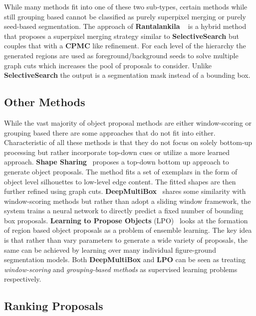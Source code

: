 While many methods fit into one of these two sub-types, certain methods while still grouping based cannot be classified as purely superpixel merging or purely seed-based segmentation. The approach of {\bf Rantalankila} \etal ~\cite{Rantalankila:etal:CVPR14} is a hybrid method that proposes a superpixel merging strategy similar to {\bf SelectiveSearch} but couples that with a {\bf CPMC} like refinement. For each level of the hierarchy the generated regions are used as foreground/background seeds to solve multiple graph cuts which increases the pool of proposals to consider. Unlike {\bf SelectiveSearch} the output is a segmentation mask instead of a bounding box.  

\subsection{Other Methods}

While the vast majority of object proposal methods are either window-scoring or grouping based there are some approaches that do not fit into either. Characteristic of all these methods is that they do not focus on solely bottom-up processing but rather incorporate top-down cues or utilize a more learned approach. {\bf Shape Sharing}~\cite{Kim:Grauman:ECCV12} proposes a top-down bottom up approach to generate object proposals. The method fits a set of exemplars in the form of object level silhouettes to low-level edge content. The fitted shapes are then further refined using graph cuts.  {\bf DeepMultiBox}~\cite{Erhan:etal:CVPR14} shares some similarity with window-scoring methods but rather than adopt a sliding window framework, the system trains a neural network to directly predict a fixed number of bounding box proposals. {\bf Learning to Propose Objects} (LPO)~\cite{Krahenbuhl:Koltun:CVPR15} looks at the formation of region based object proposals as a problem of ensemble learning. The key idea is that rather than vary parameters to generate a wide variety of proposals, the same can be achieved by learning over many individual figure-ground segmentation models.  Both {\bf DeepMultiBox} and {\bf LPO} can be seen as treating \emph{window-scoring} and \emph{grouping-based methods} as supervised learning problems respectively. 


\subsection{Ranking Proposals}


